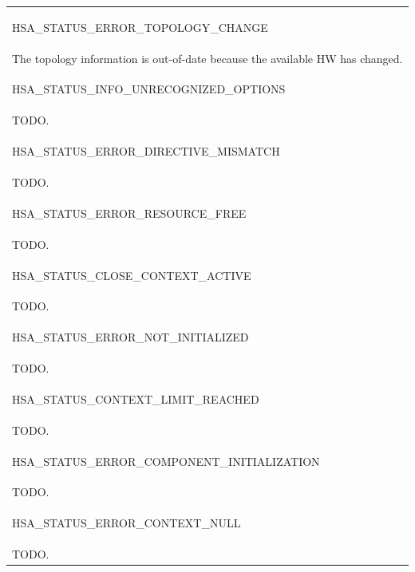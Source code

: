 \documentclass[final]{book}
\newcommand{\reftyp}[1]{#1}
\newcommand{\refenu}[1]{\reftyp{#1}}
\begin{document}
\begin{appendices}
\begin{longtable}{@{\hspace{2em}}p{\linewidth-2em}}
\hspace{-2em}\hypertarget{group--status-1ggad755322e7ff95456520e8abdbe90d225ace44d3eaae9507c7dfc6d6d5e886ee1d}{\refenu{HSA_STATUS_ERROR_TOPOLOGY_CHANGE}} \\The topology information is out-of-date because the available HW has changed.\\[2mm]
\hspace{-2em}\hypertarget{group--status-1ggad755322e7ff95456520e8abdbe90d225ad86a1ebe53e881974cd767c77aa598a3}{\refenu{HSA_STATUS_INFO_UNRECOGNIZED_OPTIONS}} \\TODO.\\[2mm]
\hspace{-2em}\hypertarget{group--status-1ggad755322e7ff95456520e8abdbe90d225a456240e6020bd5de7d4533a948a7df03}{\refenu{HSA_STATUS_ERROR_DIRECTIVE_MISMATCH}} \\TODO.\\[2mm]
\hspace{-2em}\hypertarget{group--status-1ggad755322e7ff95456520e8abdbe90d225a6406af88203fcbec4179fbb71cc66b65}{\refenu{HSA_STATUS_ERROR_RESOURCE_FREE}} \\TODO.\\[2mm]
\hspace{-2em}\hypertarget{group--status-1ggad755322e7ff95456520e8abdbe90d225ae2924e022da18c1062e3b418a5bab43c}{\refenu{HSA_STATUS_CLOSE_CONTEXT_ACTIVE}} \\TODO.\\[2mm]
\hspace{-2em}\hypertarget{group--status-1ggad755322e7ff95456520e8abdbe90d225a34ea59ade5bfce95eee935238a99f5b5}{\refenu{HSA_STATUS_ERROR_NOT_INITIALIZED}} \\TODO.\\[2mm]
\hspace{-2em}\hypertarget{group--status-1ggad755322e7ff95456520e8abdbe90d225a342227d93a263cefbacb5cde75fa386f}{\refenu{HSA_STATUS_CONTEXT_LIMIT_REACHED}} \\TODO.\\[2mm]
\hspace{-2em}\hypertarget{group--status-1ggad755322e7ff95456520e8abdbe90d225ac2b1926b00231fd6a7695c1470c43ef6}{\refenu{HSA_STATUS_ERROR_COMPONENT_INITIALIZATION}} \\TODO.\\[2mm]
\hspace{-2em}\hypertarget{group--status-1ggad755322e7ff95456520e8abdbe90d225a2ae9f2db427b200c2709bac49f4cabfb}{\refenu{HSA_STATUS_ERROR_CONTEXT_NULL}} \\TODO.\\[2mm]

\end{longtable}
\end{appendices}
\end{document}
